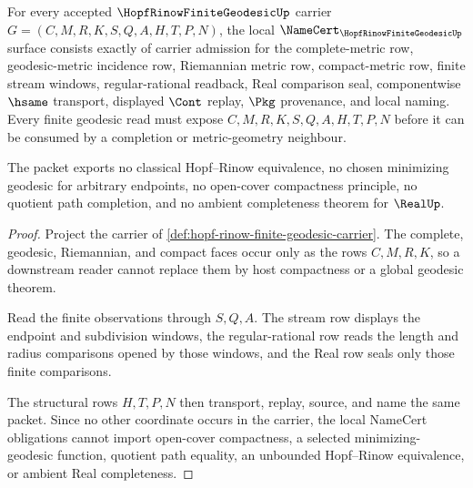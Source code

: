 \begin{theorem}
\label{thm:hopf-rinow-finite-geodesic-namecert-obligations}
For every accepted $\HopfRinowFiniteGeodesicUp$ carrier $G=(C,M,R,K,S,Q,A,H,T,P,N)$, the local $\NameCert_{\HopfRinowFiniteGeodesicUp}$ surface consists exactly of carrier admission for the complete-metric row, geodesic-metric incidence row, Riemannian metric row, compact-metric row, finite stream windows, regular-rational readback, Real comparison seal, componentwise $\hsame$ transport, displayed $\Cont$ replay, $\Pkg$ provenance, and local naming. Every finite geodesic read must expose $C,M,R,K,S,Q,A,H,T,P,N$ before it can be consumed by a completion or metric-geometry neighbour.

The packet exports no classical Hopf--Rinow equivalence, no chosen minimizing geodesic for arbitrary endpoints, no open-cover compactness principle, no quotient path completion, and no ambient completeness theorem for $\RealUp$.
\end{theorem}
\begin{proof}
Project the carrier of \autoref{def:hopf-rinow-finite-geodesic-carrier}. The complete, geodesic, Riemannian, and compact faces occur only as the rows $C,M,R,K$, so a downstream reader cannot replace them by host compactness or a global geodesic theorem.

Read the finite observations through $S,Q,A$. The stream row displays the endpoint and subdivision windows, the regular-rational row reads the length and radius comparisons opened by those windows, and the Real row seals only those finite comparisons.

The structural rows $H,T,P,N$ then transport, replay, source, and name the same packet. Since no other coordinate occurs in the carrier, the local NameCert obligations cannot import open-cover compactness, a selected minimizing-geodesic function, quotient path equality, an unbounded Hopf--Rinow equivalence, or ambient Real completeness.
\end{proof}



